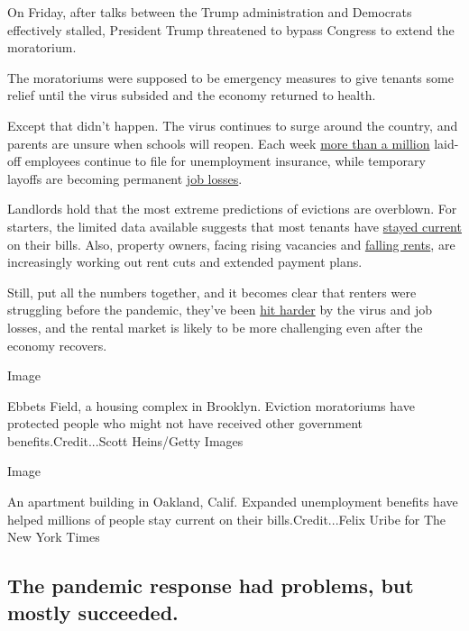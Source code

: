 On Friday, after talks between the Trump administration and Democrats
effectively stalled, President Trump threatened to bypass Congress to
extend the moratorium.

The moratoriums were supposed to be emergency measures to give tenants
some relief until the virus subsided and the economy returned to health.

Except that didn't happen. The virus continues to surge around the
country, and parents are unsure when schools will reopen. Each week
\href{https://www.nytimes.com/2020/08/06/business/economy/unemployment-claims.html}{more
than a million} laid-off employees continue to file for unemployment
insurance, while temporary layoffs are becoming permanent
\href{https://www.nytimes.com/2020/05/21/business/economy/coronavirus-unemployment-claims.html}{job
losses}.

Landlords hold that the most extreme predictions of evictions are
overblown. For starters, the limited data available suggests that most
tenants have
\href{https://www.nytimes.com/2020/05/31/business/economy/coronavirus-rent-landlords-tenants.html}{stayed
current} on their bills. Also, property owners, facing rising vacancies
and
\href{https://www.zillow.com/research/april-2020-market-report-27100/}{falling
rents}, are increasingly working out rent cuts and extended payment
plans.

Still, put all the numbers together, and it becomes clear that renters
were struggling before the pandemic, they've been
\href{https://www.jchs.harvard.edu/blog/how-much-assistance-would-it-take-to-help-renters-affected-by-covid-19/}{hit
harder} by the virus and job losses, and the rental market is likely to
be more challenging even after the economy recovers.

Image

Ebbets Field, a housing complex in Brooklyn. Eviction moratoriums have
protected people who might not have received other government
benefits.Credit...Scott Heins/Getty Images

Image

An apartment building in Oakland, Calif. Expanded unemployment benefits
have helped millions of people stay current on their
bills.Credit...Felix Uribe for The New York Times

\hypertarget{the-pandemic-response-had-problems-but-mostly-succeeded}{%
\subsection{The pandemic response had problems, but mostly
succeeded.}\label{the-pandemic-response-had-problems-but-mostly-succeeded}}

